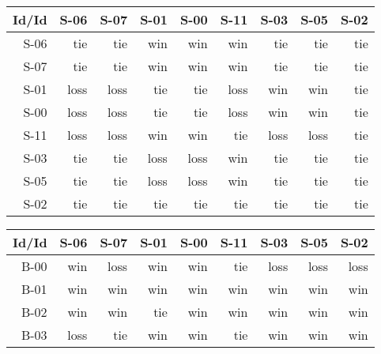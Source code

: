 \begin{tabular}{ | r | r | r | r | r | r | r | r | r | }
    \hline
        Id/Id  &   S-06  &   S-07  &   S-01  &   S-00  &   S-11  &   S-03  &   S-05  &   S-02  \\
    \hline
    \hline
         S-06  &    tie  &    tie  &    win  &    win  &    win  &    tie  &    tie  &    tie  \\
    \hline
         S-07  &    tie  &    tie  &    win  &    win  &    win  &    tie  &    tie  &    tie  \\
    \hline
         S-01  &   loss  &   loss  &    tie  &    tie  &   loss  &    win  &    win  &    tie  \\
    \hline
         S-00  &   loss  &   loss  &    tie  &    tie  &   loss  &    win  &    win  &    tie  \\
    \hline
         S-11  &   loss  &   loss  &    win  &    win  &    tie  &   loss  &   loss  &    tie  \\
    \hline
         S-03  &    tie  &    tie  &   loss  &   loss  &    win  &    tie  &    tie  &    tie  \\
    \hline
         S-05  &    tie  &    tie  &   loss  &   loss  &    win  &    tie  &    tie  &    tie  \\
    \hline
         S-02  &    tie  &    tie  &    tie  &    tie  &    tie  &    tie  &    tie  &    tie  \\
    \hline
\end{tabular}


\begin{tabular}{ | r | r | r | r | r | r | r | r | r | }
    \hline
        Id/Id  &   S-06  &   S-07  &   S-01  &   S-00  &   S-11  &   S-03  &   S-05  &   S-02  \\
    \hline
    \hline
         B-00  &    win  &   loss  &    win  &    win  &    tie  &   loss  &   loss  &   loss  \\
    \hline
         B-01  &    win  &    win  &    win  &    win  &    win  &    win  &    win  &    win  \\
    \hline
         B-02  &    win  &    win  &    tie  &    win  &    win  &    win  &    win  &    win  \\
    \hline
         B-03  &   loss  &    tie  &    win  &    win  &    tie  &    win  &    win  &    win  \\
    \hline
\end{tabular}





